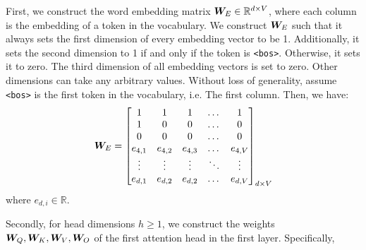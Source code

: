 \documentclass{article}
\begin{document}
First, we construct the word embedding matrix ${\bm{W}}_E \in \mathbb{R}^{d \times V}$, where each column is the embedding of a token in the vocabulary. We construct ${\bm{W}}_E$ such that it always sets the first dimension of every embedding vector to be 1. Additionally, it sets the second dimension to 1 if and only if the token is \texttt{<bos>}. Otherwise, it sets it to zero. The third dimension of all embedding vectors is set to zero. Other dimensions can take any arbitrary values. Without loss of generality, assume \texttt{<bos>} is the first token in the vocabulary, i.e. The first column. Then, we have:
\begin{align}
  \label{eq:word_embedding}
  {\bm{W}}_E = \begin{bmatrix}
            1       & 1       & 1       & \dots  & 1       \\
            1       & 0       & 0       & \dots  & 0       \\
            0       & 0       & 0       & \dots  & 0       \\
            e_{4,1} & e_{4,2} & e_{4,3} & \dots  & e_{4,V} \\
            \vdots  & \vdots  & \vdots  & \ddots & \vdots  \\
            e_{d,1} & e_{d,2} & e_{d,2} & \dots  & e_{d,V}
          \end{bmatrix}_{d \times V}
\end{align}
where $e_{d,i} \in \mathbb{R}$.

Secondly, for head dimensions $h\ge 1$, we construct the weights ${\bm{W}}_Q, {\bm{W}}_K, {\bm{W}}_V, {\bm{W}}_O$ of the first attention head in the first layer. Specifically,
\end{document}
